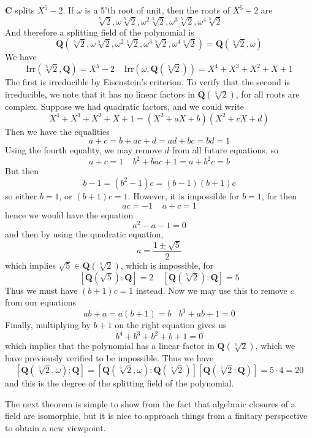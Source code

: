 \begin{example}
    $\mathbf{C}$ splits $X^5 - 2$. If $\omega$ is a 5'th root of unit, then the roots of $X^5 - 2$ are
    \[ \sqrt[5]{2}, \omega \sqrt[5]{2}, \omega^2 \sqrt[5]{2}, \omega^3 \sqrt[5]{2}, \omega^4 \sqrt[5]{2} \]
    And therefore a splitting field of the polynomial is
    \[ \mathbf{Q}(\sqrt[5]{2}, \omega \sqrt[5]{2}, \omega^2 \sqrt[5]{2}, \omega^3 \sqrt[5]{2}, \omega^4 \sqrt[5]{2}) = \mathbf{Q}(\sqrt[5]{2}, \omega) \]
    We have
    \[ \text{Irr}(\sqrt[5]{2}, \mathbf{Q}) = X^5 - 2\ \ \ \ \ \text{Irr}(\omega, \mathbf{Q}(\sqrt[5]{2})) = X^4 + X^3 + X^2 + X + 1 \]
    The first is irreducible by Eisenstein's criterion. To verify that the second is irreducible, we note that it has no linear factors in $\mathbf{Q}(\sqrt[5]{2})$, for all roots are complex. Suppose we had quadratic factors, and we could write
    \[ X^4 + X^3 + X^2 + X + 1 = (X^2 + aX + b)(X^2 + cX + d) \]
    Then we have the equalities
    \[ a + c = b + ac + d = ad + bc = bd = 1 \]
    Using the fourth equality, we may remove $d$ from all future equations, so
    \[ a + c = 1\ \ \ \ \ b^2 + bac + 1 = a + b^2c = b \]
    But then
    \[ b - 1 = (b^2 - 1)c = (b - 1)(b + 1)c \]
    so either $b = 1$, or $(b + 1)c = 1$. However, it is impossible for $b = 1$, for then
    \[ ac = -1\ \ \ \ \ a + c = 1 \]
    hence we would have the equation
    \[ a^2 - a - 1 = 0 \]
    and then by using the quadratic equation,
    \[ a = \frac{1 \pm \sqrt{5}}{2} \]
    which implies $\sqrt{5} \in \mathbf{Q}(\sqrt[5]{2})$, which is impossible, for
    \[ [\mathbf{Q}(\sqrt{5}): \mathbf{Q}] = 2\ \ \ \ \ [\mathbf{Q}(\sqrt[5]{2}): \mathbf{Q}] = 5 \]
    Thus we must have $(b + 1)c = 1$ instead. Now we may use this to remove $c$ from our equations
    \[ ab + a = a(b + 1) = b\ \ \ \ b^3 + ab + 1 = 0 \]
    Finally, multiplying by $b + 1$ on the right equation gives us
    \[ b^4 + b^3 + b^2 + b + 1 = 0 \]
    which implies that the polynomial has a linear factor in $\mathbf{Q}(\sqrt[5]{2})$, which we have previously verified to be impossible. Thus we have
    \[ [\mathbf{Q}(\sqrt[5]{2}, \omega) : \mathbf{Q}] = [\mathbf{Q}(\sqrt[5]{2}, \omega) : \mathbf{Q}(\sqrt[5]{2})][\mathbf{Q}(\sqrt[5]{2}: \mathbf{Q})] = 5 \cdot 4 = 20 \]
    and this is the degree of the splitting field of the polynomial.
\end{example}

The next theorem is simple to show from the fact that algebraic closures of a field are isomorphic, but it is nice to approach things from a finitary perspective to obtain a new viewpoint.

